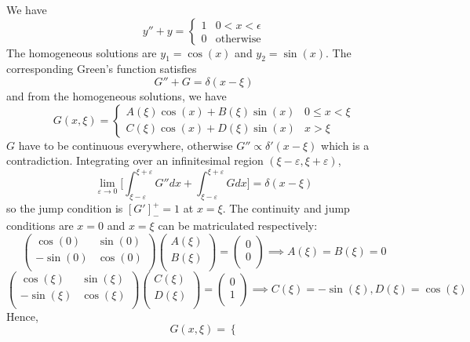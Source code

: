 \documentclass[a4paper]{article}
\begin{document}
\begin{ans}
We have 
$$y''+y=
\left\{
        \begin{array}{ll}
      1 & 0<x<\epsilon \\
      0& \text{otherwise}
        \end{array}
    \right.$$
The homogeneous solutions are $y_1=\cos(x)$ and $y_2=\sin(x)$. The corresponding Green's function satisfies
$$G''+G=\delta(x-\xi)$$
and from the homogeneous solutions, we have
$$G(x,\xi)=
\left\{
        \begin{array}{ll}
      A(\xi)\cos(x)+B(\xi)\sin(x) & 0\leq x<\xi \\
      C(\xi)\cos(x)+D(\xi)\sin(x)& x>\xi
        \end{array}
    \right.$$
$G$ have to be continuous everywhere, otherwise $G''\propto\delta'(x-\xi)$ which is a contradiction. Integrating over an infinitesimal region $(\xi-\varepsilon,\xi+\varepsilon)$,
$$\lim_{\varepsilon\rightarrow0}\bigg[\int_{\xi-\varepsilon}^{\xi+\varepsilon}G''dx+\int_{\xi-\varepsilon}^{\xi+\varepsilon}Gdx\bigg]=\delta(x-\xi)$$
so the jump condition is $[G']_-^+=1$ at $x=\xi$. The continuity and jump conditions are $x=0$ and $x=\xi$ can be matriculated respectively:
$$\begin{pmatrix}\cos(0)&\sin(0)\\-\sin(0)&\cos(0)\\\end{pmatrix}\begin{pmatrix}A(\xi)\\B(\xi)\\\end{pmatrix}=\begin{pmatrix}0\\0\\\end{pmatrix}\implies A(\xi)=B(\xi)=0$$
$$\begin{pmatrix}\cos(\xi)&\sin(\xi)\\-\sin(\xi)&\cos(\xi)\\\end{pmatrix}\begin{pmatrix}C(\xi)\\D(\xi)\\\end{pmatrix}=\begin{pmatrix}0\\1\\\end{pmatrix}\implies C(\xi)=-\sin(\xi),D(\xi)=\cos(\xi)$$
Hence, 
$$G(x,\xi)=
\left\{
$$
\end{ans}
\end{document}
